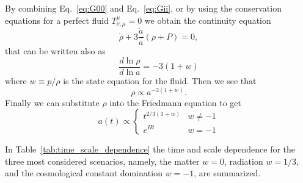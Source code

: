 \documentclass[12pt,letterpaper,twoside]{book}
\begin{document}
By combining Eq.~\eqref{eq:G00} and Eq.~\eqref{eq:Gii}, or by using the
conservation equations for a perfect fluid $T^\mu_{\nu;\mu}=0$ we obtain the
continuity equation
\begin{equation}
    \label{Ec_fluido}
    \boxed{\dot{\rho}+3\frac{\dot{a}}{a}\left(\rho+P\right)=0},
\end{equation}
that can be written also as
\begin{equation}
    \frac{d\ln \rho}{d\ln a} = -3 (1 + w)
\end{equation}
where $w\equiv p/\rho$ is the state equation for the fluid. Then we see that
\begin{equation}
    \rho \propto a^{-3(1+w)}.
\end{equation}
Finally we can substitute $\rho$ into the Friedmann equation to get
\begin{equation}
    a(t) \propto
    \begin{cases}
        t^{2/3(1+w)} & w\neq -1\\
        e^{Ht} & w=-1
    \end{cases}
\end{equation}


In Table~\ref{tab:time_scale_dependence} the time and scale dependence for the
three most considered scenarios, namely, the matter $w=0$, radiation $w=1/3$,
and the cosmological constant domination $w=-1$, are summarized.
\end{document}

